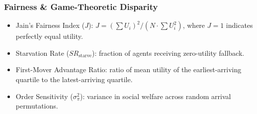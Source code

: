 \documentclass{article}
\begin{document}
\subsubsection*{Fairness \& Game-Theoretic Disparity}
\begin{itemize}[leftmargin=*] 
    \item Jain's Fairness Index ($J$): $J = \left(\sum U_i\right)^2 / \left(N \cdot \sum U_i^2\right)$, where $J = 1$ indicates perfectly equal utility.
    \item Starvation Rate ($SR_{\text{starve}}$): fraction of agents receiving zero-utility fallback.
    \item First-Mover Advantage Ratio: ratio of mean utility of the earliest-arriving quartile to the latest-arriving quartile.
    \item Order Sensitivity ($\sigma^2_{\pi}$): variance in social welfare across random arrival permutations.
\end{itemize}


\end{document}
